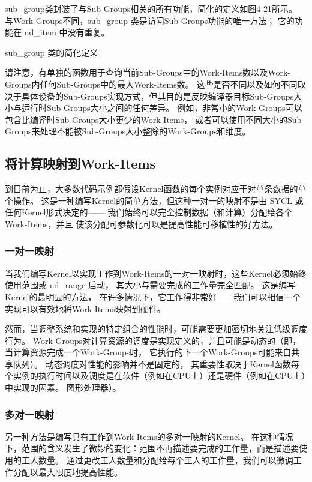 sub\_group类封装了与Sub-Groups相关的所有功能，简化的定义如图4-21所示。 
与Work-Groups不同，sub\_group 类是访问Sub-Groups功能的唯一方法； 它的功能在 nd\_item 中没有重复。

{\color{red} sub\_group 类的简化定义}

请注意，有单独的函数用于查询当前Sub-Groups中的Work-Items数以及Work-Groups内任何Sub-Groups中的最大Work-Items数。 
这些是否不同以及如何不同取决于具体设备的Sub-Groups实现方式，但其目的是反映编译器目标Sub-Groups大小与运行时Sub-Groups大小之间的任何差异。 
例如，非常小的Work-Groups可以包含比编译时Sub-Groups大小更少的Work-Items，
或者可以使用不同大小的Sub-Groups来处理不能被Sub-Groups大小整除的Work-Groups和维度。

\subsection{将计算映射到Work-Items}
到目前为止，大多数代码示例都假设Kernel函数的每个实例对应于对单条数据的单个操作。 
这是一种编写Kernel的简单方法，但这种一对一的映射不是由 SYCL 或任何Kernel形式决定的——
我们始终可以完全控制数据（和计算）分配给各个Work-Items，并且 使该分配可参数化可以是提高性能可移植性的好方法。

\subsubsection{一对一映射}
当我们编写Kernel以实现工作到Work-Items的一对一映射时，这些Kernel必须始终使用范围或 nd\_range 启动，
其大小与需要完成的工作量完全匹配。 这是编写Kernel的最明显的方法，
在许多情况下，它工作得非常好——我们可以相信一个实现可以有效地将Work-Items映射到硬件。

然而，当调整系统和实现的特定组合的性能时，可能需要更加密切地关注低级调度行为。 
Work-Groups对计算资源的调度是实现定义的，并且可能是动态的（即，当计算资源完成一个Work-Groups时，
它执行的下一个Work-Groups可能来自共享队列）。 动态调度对性能的影响并不是固定的，
其重要性取决于Kernel函数每个实例的执行时间以及调度是在软件（例如在CPU上）还是硬件（例如在CPU上）中实现的因素。 
图形处理器）。

\subsubsection{多对一映射}
另一种方法是编写具有工作到Work-Items的多对一映射的Kernel。 
在这种情况下，范围的含义发生了微妙的变化：范围不再描述要完成的工作量，而是描述要使用的工人数量。 
通过更改工人数量和分配给每个工人的工作量，我们可以微调工作分配以最大限度地提高性能。

